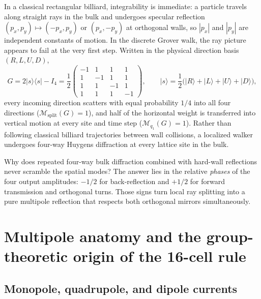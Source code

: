 \documentclass[11pt,a4paper,oneside]{report}
\newcommand{\ket}[1]{\lvert #1\rangle}
\newcommand{\bra}[1]{\langle #1\rvert}
\newcommand{\Id}{I}
\numberwithin{equation}{chapter}
\begin{document}
In a classical rectangular billiard, integrability is immediate: a particle
travels along straight rays in the bulk and undergoes specular reflection
\((p_x,p_y)\mapsto(-p_x,p_y)\) or \((p_x,-p_y)\) at orthogonal walls, so
\(|p_x|\) and \(|p_y|\) are independent constants of motion. In the discrete
Grover walk, the ray picture appears to fail at the very first step. Written
in the physical direction basis \((R,L,U,D)\),
\begin{equation}
G=2\ket s\bra s-\Id_4=\frac12\begin{pmatrix}
-1&1&1&1\\1&-1&1&1\\1&1&-1&1\\1&1&1&-1
\end{pmatrix},\qquad
\ket s=\frac12\big(\ket R+\ket L+\ket U+\ket D\big),
\end{equation}
every incoming direction scatters with equal probability \(1/4\) into all
four directions (\(\mathcal M_{\mathrm{split}}(G)=1\)), and half of the
horizontal weight is transferred into vertical motion at every site and
time step (\(\mathcal M_{q_1}(G)=1\)). Rather than following classical
billiard trajectories between wall collisions, a localized walker undergoes
four-way Huygens diffraction at every lattice site in the bulk.

Why does repeated four-way bulk diffraction combined with hard-wall
reflections never scramble the spatial modes? The answer lies in the
relative \emph{phases} of the four output amplitudes: \(-1/2\) for
back-reflection and \(+1/2\) for forward transmission and orthogonal turns.
Those signs turn local ray splitting into a pure multipole reflection that
respects both orthogonal mirrors simultaneously.

\section{Multipole anatomy and the group-theoretic origin of the 16-cell rule}
\label{sec:multipole}

\subsection{Monopole, quadrupole, and dipole currents}
\end{document}
